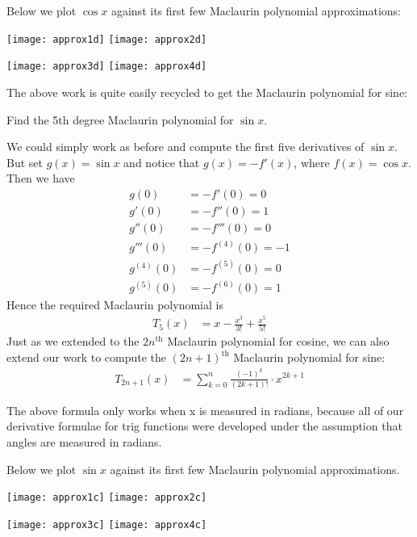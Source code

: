 \begin{eg}
Below we plot $\cos x$ against its first few Maclaurin polynomial
approximations:
\begin{efig}
\begin{center}

  \texttt{[image: approx1d]} \qquad\qquad
  \texttt{[image: approx2d]}
\end{center}
\end{efig}
\begin{efig}
\begin{center}
  \texttt{[image: approx3d]} \qquad\qquad
  \texttt{[image: approx4d]}
\end{center}
\end{efig}

\end{eg}
The above work is quite easily recycled to get the Maclaurin polynomial for sine:
\begin{eg}\label{eg expand sinx}
 Find the 5th degree Maclaurin polynomial for $\sin x$.

\soln We could simply work as before and compute the first five derivatives of $\sin x$.
But set $g(x) = \sin x$ and notice that $g(x) = - f'(x)$, where $f(x) =\cos x$. Then we
have
\begin{align*}
  g(0) &= -f'(0) = 0 \\
  g'(0) &= -f''(0) = 1\\
  g''(0) &= -f'''(0) = 0\\
  g'''(0) &= -f^{(4)}(0) = -1\\
  g^{(4)}(0) &= -f^{(5)}(0) = 0\\
  g^{(5)}(0) &= -f^{(6)}(0) = 1
\end{align*}
Hence the required Maclaurin polynomial is
\begin{align*}
  T_5(x) &= x - \frac{x^3}{3!} + \frac{x^5}{5!}
\end{align*}
Just as we extended to the $2n^\mathrm{th}$ Maclaurin polynomial for cosine, we can also
extend our work to compute the $(2n+1)^\mathrm{th}$ Maclaurin polynomial for sine:
\begin{align*}
  T_{2n+1}(x) &= \sum_{k=0}^n \frac{(-1)^k}{(2k+1)!} \cdot x^{2k+1}
\end{align*}
\begin{warning}
The above formula only works when x is measured in radians, because all of our
derivative formulae for trig functions were developed under the assumption that
angles are measured in radians.
\end{warning}


Below we plot $\sin x$ against its first few Maclaurin polynomial approximations.
\begin{efig}
\begin{center}

  \texttt{[image: approx1c]} \qquad\qquad
  \texttt{[image: approx2c]}
\end{center}
\begin{center}
  \texttt{[image: approx3c]} \qquad\qquad
  \texttt{[image: approx4c]}
\end{center}
\end{efig}

\end{eg}


